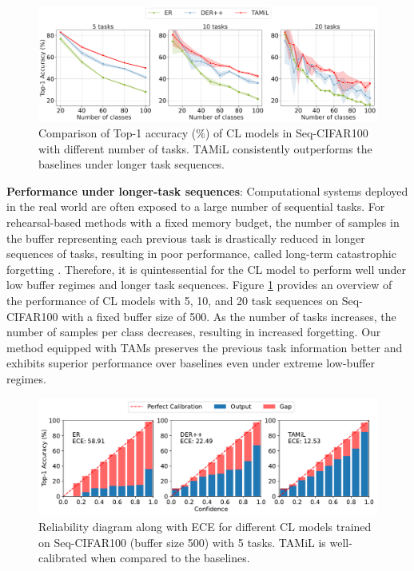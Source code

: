 \documentclass{article} %
\begin{document}
\begin{figure}[t]
  \centering
  \includegraphics[width=0.9\linewidth]{images/cifar100.pdf}
  \caption{Comparison of Top-1 accuracy ($\%$) of CL models in Seq-CIFAR100 with different number of tasks. TAMiL consistently outperforms the baselines under longer task sequences. }
  \label{fig:longer}
\end{figure}

\textbf{Performance under longer-task sequences}: Computational systems deployed in the real world are often exposed to a large number of sequential tasks. For rehearsal-based methods with a fixed memory budget, the number of samples in the buffer representing each previous task is drastically reduced in longer sequences of tasks, resulting in poor performance, called long-term catastrophic forgetting \citep{peng2021overcoming}. Therefore, it is quintessential for the CL model to perform well under low buffer regimes and longer task sequences. Figure \ref{fig:longer} provides an overview of the performance of CL models with 5, 10, and 20 task sequences on Seq-CIFAR100 with a fixed buffer size of 500.  As the number of tasks increases, the number of samples per class decreases, resulting in increased forgetting. Our method equipped with TAMs preserves the previous task information better and exhibits superior performance over baselines even under extreme low-buffer regimes. 

\begin{figure}[h]
  \centering
  \includegraphics[width=0.9\linewidth, keepaspectratio]{images/calibration.pdf}
  \caption{Reliability diagram along with ECE for different CL models trained on Seq-CIFAR100 (buffer size 500) with 5 tasks. TAMiL is well-calibrated  when compared to the baselines.}
  \label{fig:calibration}
\end{figure}
\end{document}
